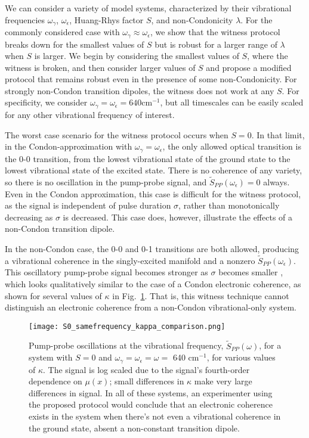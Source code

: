 We can consider a variety of model systems, characterized by their vibrational frequencies $\omega_{\gamma}$, $\omega_{\epsilon}$,  Huang-Rhys factor $S$, and non-Condonicity $\lambda$.  For the commonly considered case with $\omega_\gamma\approx\omega_\epsilon$, we show that the witness protocol breaks down for the smallest values of $S$ but is robust for a larger range of $\lambda$ when $S$ is larger. We begin by considering the smallest values of $S$, where the witness is broken, and then consider larger values of $S$ and propose a modified protocol that remains robust even in the presence of some non-Condonicity. For strongly non-Condon transition dipoles, the witness does not work at any $S$.  For specificity, we consider $\omega_{\gamma} = \omega_{\epsilon}= 640 \text{cm}^{-1}$, but all timescales can be easily scaled for any other vibrational frequency of interest.

The worst case scenario for the witness protocol occurs when $S=0$. In that limit, in the Condon-approximation with $\omega_{\gamma} = \omega_{\epsilon}$, the only allowed optical transition is the 0-0 transition, from the lowest vibrational state of the ground state to the lowest vibrational state of the excited state. There is no coherence of any variety, so there is no oscillation in the pump-probe signal, and $\tilde{S}_{PP}(\omega_\epsilon)=0$ always. Even in the Condon approximation, this case is difficult  for the witness protocol, as the signal is independent of pulse duration $\sigma$, rather than monotonically decreasing as $\sigma$ is decreased. This case does, however, illustrate the effects of a non-Condon transition dipole.

In the non-Condon case, the 0-0 and 0-1 transitions are both allowed, producing a vibrational coherence in the singly-excited manifold and a nonzero $\tilde{S}_{PP}(\omega_\epsilon)$. This oscillatory pump-probe signal becomes stronger as $\sigma$ becomes smaller
, which looks qualitatively similar to the case of a Condon electronic coherence, as shown for several values of $\kappa$ in Fig.\ \ref{fig:tunedZero}. That is, this witness technique cannot distinguish an electronic coherence from a non-Condon vibrational-only system.

\begin{figure}
   \texttt{[image: S0\_samefrequency\_kappa\_comparison.png]}
   \caption{Pump-probe oscillations at the vibrational frequency, $\tilde{S}_{PP} ( \omega)$, for a system with $S=0$ and $\omega_{\gamma} = \omega_{\epsilon} = \omega = $ 640 cm$^{-1}$, for various values of $\kappa$.  The signal is log scaled due to the signal's fourth-order dependence on $\mu(x)$; small differences in $\kappa$ make very large differences in signal.  In all of these systems, an experimenter using the proposed protocol would conclude that an electronic coherence exists in the system when there's not even a vibrational coherence in the ground state, absent a non-constant transition dipole. }
	\label{fig:tunedZero}
\end{figure}


